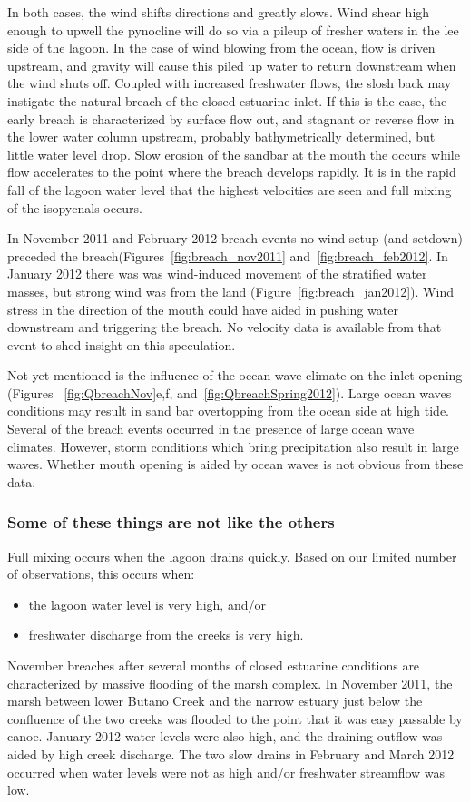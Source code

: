 In both cases, the wind shifts directions and greatly slows. Wind shear high enough to upwell the pynocline will do so via a pileup of fresher waters in the lee side of the lagoon. In the case of wind blowing from the ocean, flow is driven upstream, and gravity will cause this piled up water to return downstream when the wind shuts off. Coupled with increased freshwater flows, the slosh back may instigate the natural breach of the closed estuarine inlet. 
If this is the case, the early breach is characterized by surface flow out, and stagnant or reverse flow in the lower water column upstream, probably bathymetrically determined, but little water level drop. Slow erosion of the sandbar at the mouth the occurs while flow accelerates to the point where the breach develops rapidly. It is in the rapid fall of the lagoon water level that the highest velocities are seen and full mixing of the isopycnals occurs. 

In November 2011 and February 2012 breach events no wind setup (and setdown) preceded the breach(Figures~\ref{fig:breach_nov2011} and~\ref{fig:breach_feb2012}. In January 2012 there was was wind-induced movement of the stratified water masses, but strong wind was from the land (Figure~\ref{fig:breach_jan2012}). Wind stress in the direction of the mouth could have aided in pushing water downstream and triggering the breach. No velocity data is available from that event to shed insight on this speculation.

Not yet mentioned is the influence of the ocean wave climate on the inlet opening (Figures ~\ref{fig:QbreachNov}e,f, and~\ref{fig:QbreachSpring2012}). Large ocean waves conditions may result in sand bar overtopping from the ocean side at high tide. Several of the breach events occurred in the presence of large ocean wave climates. However, storm conditions which bring precipitation also result in large waves. Whether mouth opening is aided by ocean waves is not obvious from these data. 

\subsubsection{Some of these things are not like the others}

Full mixing occurs when the lagoon drains quickly. Based on our limited number of observations, this occurs when:
\begin{itemize}
	\item the lagoon water level is very high, and/or
	\item freshwater discharge from the creeks is very high.
\end{itemize}
November breaches after several months of closed estuarine conditions are characterized by massive flooding of the marsh complex. In November 2011, the marsh between lower Butano Creek and the narrow estuary just below the confluence of the two creeks was flooded to the point that it was easy passable by canoe. January 2012 water levels were also high, and the draining outflow was aided by high creek discharge. The two slow drains in February and March 2012 occurred when water levels were not as high and/or freshwater streamflow was low.

